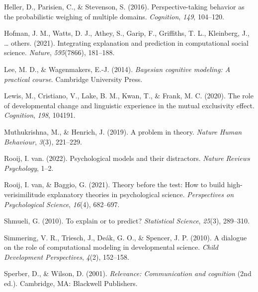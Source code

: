 \documentclass[
  man,floatsintext]{apa6}
\newlength{\cslhangindent}
\newlength{\cslentryspacingunit} %
\newenvironment{CSLReferences}[2] %
 {%
  \setlength{\parindent}{0pt}
  \ifodd #1
  \let\oldpar\par
  \def\par{\hangindent=\cslhangindent\oldpar}
  \fi
  \setlength{\parskip}{#2\cslentryspacingunit}
 }%
 {}
\begin{document}
\begin{CSLReferences}{1}{0}
\leavevmode{}%
Heller, D., Parisien, C., \& Stevenson, S. (2016). Perspective-taking behavior as the probabilistic weighing of multiple domains. \emph{Cognition}, \emph{149}, 104--120.

\leavevmode{}%
Hofman, J. M., Watts, D. J., Athey, S., Garip, F., Griffiths, T. L., Kleinberg, J., \ldots{} others. (2021). Integrating explanation and prediction in computational social science. \emph{Nature}, \emph{595}(7866), 181--188.

\leavevmode{}%
Lee, M. D., \& Wagenmakers, E.-J. (2014). \emph{Bayesian cognitive modeling: A practical course}. Cambridge University Press.

\leavevmode{}%
Lewis, M., Cristiano, V., Lake, B. M., Kwan, T., \& Frank, M. C. (2020). The role of developmental change and linguistic experience in the mutual exclusivity effect. \emph{Cognition}, \emph{198}, 104191.

\leavevmode{}%
Muthukrishna, M., \& Henrich, J. (2019). A problem in theory. \emph{Nature Human Behaviour}, \emph{3}(3), 221--229.

\leavevmode{}%
Rooij, I. van. (2022). Psychological models and their distractors. \emph{Nature Reviews Psychology}, 1--2.

\leavevmode{}%
Rooij, I. van, \& Baggio, G. (2021). Theory before the test: How to build high-verisimilitude explanatory theories in psychological science. \emph{Perspectives on Psychological Science}, \emph{16}(4), 682--697.

\leavevmode{}%
Shmueli, G. (2010). To explain or to predict? \emph{Statistical Science}, \emph{25}(3), 289--310.

\leavevmode{}%
Simmering, V. R., Triesch, J., Deák, G. O., \& Spencer, J. P. (2010). A dialogue on the role of computational modeling in developmental science. \emph{Child Development Perspectives}, \emph{4}(2), 152--158.

\leavevmode{}%
Sperber, D., \& Wilson, D. (2001). \emph{Relevance: Communication and cognition} (2nd ed.). Cambridge, MA: Blackwell Publishers.


\end{CSLReferences}
\end{document}
